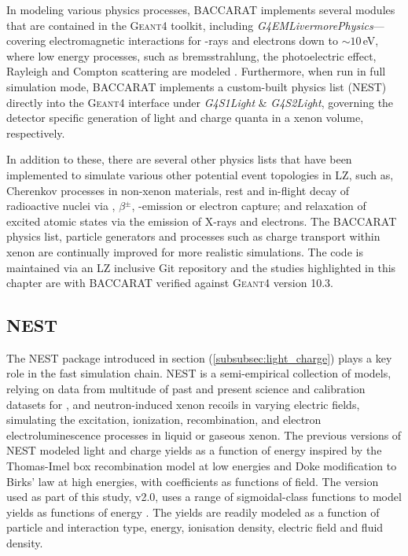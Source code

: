 In modeling various physics processes, \textsc{BACCARAT} implements several modules that are contained in the \textsc{Geant4} toolkit, including \textit{G4EMLivermorePhysics}---covering electromagnetic interactions for \gamma{}-rays and electrons down to $\sim10$\,eV, where low energy processes, such as bremsstrahlung, the photoelectric effect, Rayleigh and Compton scattering are modeled \cite{osti_295438, osti_5691165}. Furthermore, when run in full simulation mode, \textsc{BACCARAT} implements a custom-built physics list (NEST) directly into the \textsc{Geant4} interface under \textit{G4S1Light} \& \textit{G4S2Light}, governing the detector specific generation of light and charge quanta in a xenon volume, respectively.

In addition to these, there are several other physics lists that have been implemented to simulate various other potential event topologies in LZ, such as, Cherenkov processes in non-xenon materials, rest and in-flight decay of radioactive nuclei via \alpha, $\beta{}^{\pm}$, \gamma-emission or electron capture; and relaxation of excited atomic states via the emission of X-rays and electrons. The \textsc{BACCARAT} physics list, particle generators and processes such as charge transport within xenon are continually improved for more realistic simulations. The code is maintained via an LZ inclusive Git repository and the studies highlighted in this chapter are with BACCARAT verified against \textsc{Geant4} version 10.3.


\subsection{NEST}
\label{secsec:NEST}

The NEST package introduced in section (\ref{subsubsec:light_charge}) plays a key role in the fast simulation chain. NEST is a semi-empirical collection of models, relying on data from multitude of past and present science and calibration datasets for \beta, \gamma and neutron-induced xenon recoils in varying electric fields, simulating the excitation, ionization, recombination, and electron electroluminescence processes in liquid or gaseous xenon. The previous versions of NEST \cite{Szydagis_2011, Mock_2014} modeled light and charge yields as a function of energy inspired by the Thomas-Imel box recombination model at low energies \cite{PhysRevA.36.614} and Doke modification to Birks’ law \cite{DOKE1988291} at high energies, with coefficients as functions of field. The version used as part of this study, v2.0, uses a range of sigmoidal-class functions to model yields as functions of energy \cite{nest_v2}. The yields are readily modeled as a function of particle and interaction type, energy, ionisation density, electric field and fluid density.

